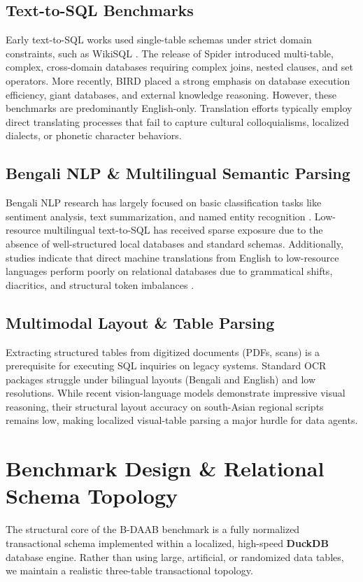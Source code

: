 \documentclass[11pt,a4paper]{article}
\begin{document}
\subsection{Text-to-SQL Benchmarks}
Early text-to-SQL works used single-table schemas under strict domain constraints, such as WikiSQL \cite{zhong2017seq2sql}. The release of Spider \cite{yu2018spider} introduced multi-table, complex, cross-domain databases requiring complex joins, nested clauses, and set operators. More recently, BIRD \cite{li2023bird} placed a strong emphasis on database execution efficiency, giant databases, and external knowledge reasoning. However, these benchmarks are predominantly English-only. Translation efforts typically employ direct translating processes that fail to capture cultural colloquialisms, localized dialects, or phonetic character behaviors.

\subsection{Bengali NLP & Multilingual Semantic Parsing}
Bengali NLP research has largely focused on basic classification tasks like sentiment analysis, text summarization, and named entity recognition \cite{bhattacharya2022bengali}. Low-resource multilingual text-to-SQL has received sparse exposure due to the absence of well-structured local databases and standard schemas. Additionally, studies indicate that direct machine translations from English to low-resource languages perform poorly on relational databases due to grammatical shifts, diacritics, and structural token imbalances \cite{bakry2024multilingual, sarker2025bengas}.

\subsection{Multimodal Layout & Table Parsing}
Extracting structured tables from digitized documents (PDFs, scans) is a prerequisite for executing SQL inquiries on legacy systems. Standard OCR packages struggle under bilingual layouts (Bengali and English) and low resolutions. While recent vision-language models demonstrate impressive visual reasoning, their structural layout accuracy on south-Asian regional scripts remains low, making localized visual-table parsing a major hurdle for data agents.

\section{Benchmark Design & Relational Schema Topology}
The structural core of the B-DAAB benchmark is a fully normalized transactional schema implemented within a localized, high-speed \textbf{DuckDB} database engine. Rather than using large, artificial, or randomized data tables, we maintain a realistic three-table transactional topology.
\end{document}
